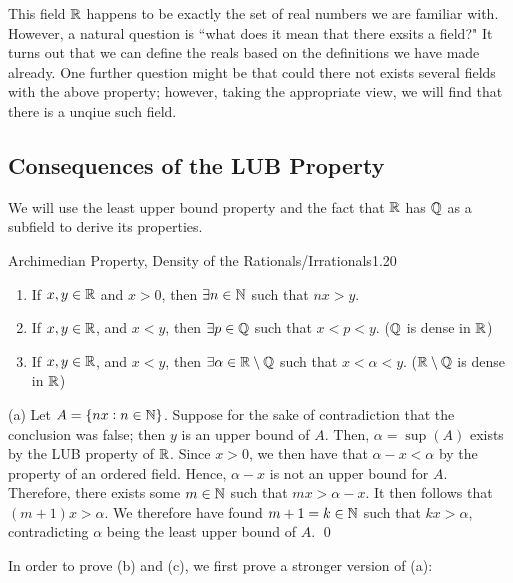 This field $\mathbb{R}$ happens to be exactly the set of real numbers we are familiar with. However, a natural question is ``what does it mean that there exsits a field?" It turns out that we can define the reals based on the definitions we have made already. One further question might be that could there not exists several fields with the above property; however, taking the appropriate view, we will find that there is a unqiue such field. 

\subsection{Consequences of the LUB Property}
We will use the least upper bound property and the fact that $\mathbb{R}$ has $\mathbb{Q}$ as a subfield to derive its properties.
\begin{theorem}{Archimedian Property, Density of the Rationals/Irrationals}{1.20}
    \begin{enumerate}
        \item If $x, y \in \mathbb{R}$ and $x > 0$, then $\exists n \in \mathbb{N}$ such that $nx > y$.
        \item If $x, y \in \mathbb{R}$, and $x < y$, then $\exists p \in \mathbb{Q}$ such that $x < p < y$. ($\mathbb{Q}$ is dense in $\mathbb{R}$)
        \item If $x, y \in \mathbb{R}$, and $x < y$, then $\exists \alpha \in \mathbb{R} \setminus \mathbb{Q}$ such that $x < \alpha < y$. ($\mathbb{R}\setminus\mathbb{Q}$ is dense in $\mathbb{R}$)
    \end{enumerate}
\end{theorem}

\begin{nproof}
    (a) Let $A = \set{nx: n \in \mathbb{N}}$. Suppose for the sake of contradiction that the conclusion was false; then $y$ is an upper bound of $A$. Then, $\alpha = \sup(A)$ exists by the LUB property of $\mathbb{R}$. Since $x > 0$, we then have that $\alpha - x < \alpha$ by the property of an ordered field. Hence, $\alpha - x$ is not an upper bound for $A$. Therefore, there exists some $m \in \mathbb{N}$ such that $mx > \alpha - x$. It then follows that $(m+1)x > \alpha$. We therefore have found $m+1 = k \in \mathbb{N}$ such that $kx > \alpha$, contradicting $\alpha$ being the least upper bound of $A$. \qed
\end{nproof}

\noindent In order to prove (b) and (c), we first prove a stronger version of (a):

